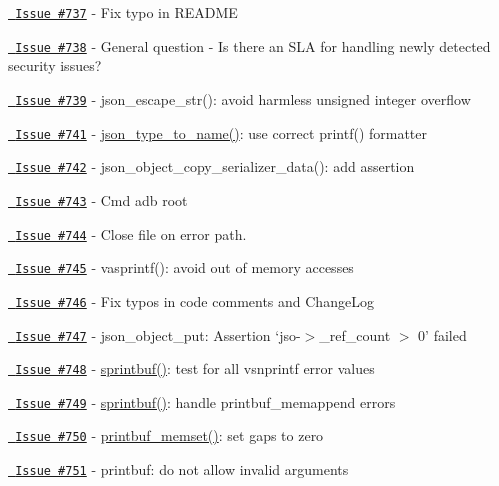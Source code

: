 \begin{DoxyItemize}
\item \href{https://github.com/json-c/json-c/issues/737}{\texttt{ Issue \#737}} -\/ Fix typo in README
\item \href{https://github.com/json-c/json-c/issues/738}{\texttt{ Issue \#738}} -\/ General question -\/ Is there an SLA for handling newly detected security issues?
\item \href{https://github.com/json-c/json-c/issues/739}{\texttt{ Issue \#739}} -\/ json\+\_\+escape\+\_\+str()\+: avoid harmless unsigned integer overflow
\item \href{https://github.com/json-c/json-c/issues/741}{\texttt{ Issue \#741}} -\/ \mbox{\hyperlink{json__util_8h_a762aaf3df0a9c7b6919cdc1035348012}{json\+\_\+type\+\_\+to\+\_\+name()}}\+: use correct printf() formatter
\item \href{https://github.com/json-c/json-c/issues/742}{\texttt{ Issue \#742}} -\/ json\+\_\+object\+\_\+copy\+\_\+serializer\+\_\+data()\+: add assertion
\item \href{https://github.com/json-c/json-c/issues/743}{\texttt{ Issue \#743}} -\/ Cmd adb root
\item \href{https://github.com/json-c/json-c/issues/744}{\texttt{ Issue \#744}} -\/ Close file on error path.
\item \href{https://github.com/json-c/json-c/issues/745}{\texttt{ Issue \#745}} -\/ vasprintf()\+: avoid out of memory accesses
\item \href{https://github.com/json-c/json-c/issues/746}{\texttt{ Issue \#746}} -\/ Fix typos in code comments and Change\+Log
\item \href{https://github.com/json-c/json-c/issues/747}{\texttt{ Issue \#747}} -\/ json\+\_\+object\+\_\+put\+: Assertion `jso-\/$>$\+\_\+ref\+\_\+count $>$ 0' failed
\item \href{https://github.com/json-c/json-c/issues/748}{\texttt{ Issue \#748}} -\/ \mbox{\hyperlink{printbuf_8h_a61f6bc0b1ca5787f0faca6799d61a0bb}{sprintbuf()}}\+: test for all vsnprintf error values
\item \href{https://github.com/json-c/json-c/issues/749}{\texttt{ Issue \#749}} -\/ \mbox{\hyperlink{printbuf_8h_a61f6bc0b1ca5787f0faca6799d61a0bb}{sprintbuf()}}\+: handle printbuf\+\_\+memappend errors
\item \href{https://github.com/json-c/json-c/issues/750}{\texttt{ Issue \#750}} -\/ \mbox{\hyperlink{printbuf_8h_a93a27f4f8a092c58666724de23ae804d}{printbuf\+\_\+memset()}}\+: set gaps to zero
\item \href{https://github.com/json-c/json-c/issues/751}{\texttt{ Issue \#751}} -\/ printbuf\+: do not allow invalid arguments

\end{DoxyItemize}
